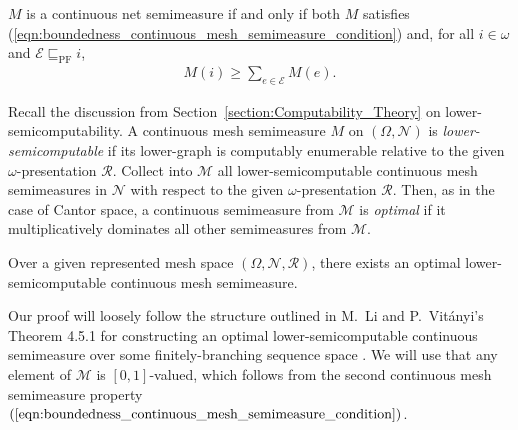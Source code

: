 \begin{proposition}
    \label{mutually_incomparable_continuous_semimeasure_property}
   $M$ is a continuous net semimeasure if and only if both $M$ satisfies (\ref{eqn:boundedness_continuous_mesh_semimeasure_condition}) and, for all $i \in \omega$ and $\mathcal{E} \sqsubseteq_{\operatorname{PF}} i$,
    \begin{align*}
        M(i) \geq \sum_{e \in \mathcal{E}} M(e).
    \end{align*}
\end{proposition}

Recall the discussion from Section~\ref{section:Computability_Theory} on lower-semicomputability. A continuous mesh semimeasure $M$ on $(\Omega, \mathcal{N})$ is \textit{lower-semicomputable} if its lower-graph is computably enumerable relative to the given $\omega$-presentation $\mathscr{R}$. 
Collect into $\mathcal{M}$ all lower-semicomputable continuous mesh semimeasures in $\mathcal{N}$ with respect to the given $\omega$-presentation $\mathscr{R}$. Then, as in the case of Cantor space, a continuous semimeasure from $\mathcal{M}$ is \textit{optimal} if it multiplicatively dominates all other semimeasures from $\mathcal{M}$.


\begin{theorem}
    Over a given represented mesh space $(\Omega, \mathcal{N}, \mathscr{R})$, there exists an optimal lower-semicomputable continuous mesh semimeasure.
    \label{prop:exists_optimal}
\end{theorem}
Our proof will loosely follow the structure outlined in M.~Li and P.~Vit{\'a}nyi's Theorem 4.5.1 for constructing an optimal lower-semicomputable continuous semimeasure over some finitely-branching sequence space \cite{LV08}. We will use that any element of $\mathcal{M}$ is $[0,1]$-valued, which follows from the second continuous mesh semimeasure property $(\ref{eqn:boundedness_continuous_mesh_semimeasure_condition})$. 

